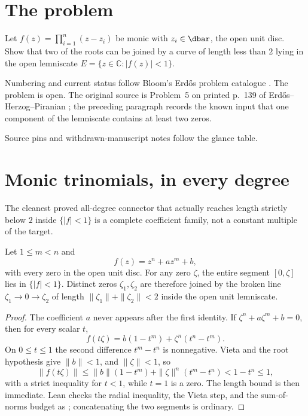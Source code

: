 \section{The problem}\label{sec:problem}

\begin{problem}[Erd\H{o}s \#1041]\label{res:problem}
Let $f(z)=\prod_{i=1}^{n}(z-z_i)$ be monic with $z_i\in\dbar$, the open unit
disc.  Show that two of the roots can be joined by a curve of length less than
$2$ lying in the open lemniscate $E=\{z\in\mathbb{C}:|f(z)|<1\}$.
\end{problem}

\noindent Numbering and current status follow Bloom's Erd\H{o}s problem
catalogue \cite{bloom}.
The problem is open.  The original source is Problem~5 on printed p.~139 of
Erd\H{o}s--Herzog--Piranian \cite[p.~139]{ehp1958}; the preceding paragraph records the
known input that one component of the lemniscate contains at least two zeros.

Source pins and withdrawn-manuscript notes follow the glance table.

\statusboundary

\section{Monic trinomials, in every degree}
\label{sec:trinomial}

The cleanest proved all-degree connector that actually reaches length strictly
below $2$ inside $\{|f|<1\}$ is a complete coefficient family, not a constant
multiple of the target.

\begin{theorem}
\label{res:trinomial-all-degree}
Let $1\le m<n$ and
\[
 f(z)=z^n+az^m+b,
\]
with every zero in the open unit disc.  For any zero $\zeta$, the entire
segment $[0,\zeta]$ lies in $\{|f|<1\}$.  Distinct zeros $\zeta_1,\zeta_2$
are therefore joined by the broken line $\zeta_1\to0\to\zeta_2$ of length
$\|\zeta_1\|+\|\zeta_2\|<2$ inside the open unit lemniscate.
\end{theorem}

\begin{proof}
The coefficient $a$ never appears after the first identity.  If
$\zeta^n+a\zeta^m+b=0$, then for every scalar $t$,
\[
 f(t\zeta)=b(1-t^m)+\zeta^n(t^n-t^m).
\]
On $0\le t\le1$ the second difference $t^m-t^n$ is nonnegative.  Vieta and
the root hypothesis give $\|b\|<1$, and $\|\zeta\|<1$, so
\[
 \|f(t\zeta)\|\le\|b\|(1-t^m)+\|\zeta\|^n(t^m-t^n)<1-t^n\le1,
\]
with a strict inequality for $t<1$, while $t=1$ is a zero.  The length bound
is then immediate.  Lean checks the radial inequality, the Vieta step, and
the sum-of-norms budget as
; concatenating the two segments is
ordinary.
\end{proof}

